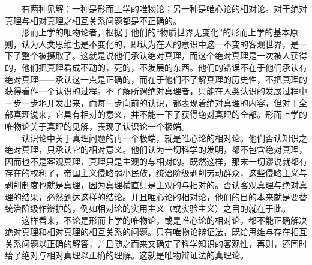 \documentclass[cn,11pt,chinese]{elegantbook}
\begin{document}
　　有两种见解：一种是形而上学的唯物论；另一种是唯心论的相对论。对于绝对真理与相对真理之相互关系问题都是不正确的。\\
　　形而上学的唯物论者，根据于他们的“物质世界无变化”的形而上学的基本原则，认为人类思维也是不变化的，即认为在人的意识中这一不变的客观世界，是一下子整个被摄取了。这就是说他们承认绝对真理，而这个绝对真理是一次被人获得的，他们把真理看成不动的，死的，不发展的东西。他们的错误不在于他们承认有绝对真理——承认这一点是正确的，而在于他们不了解真理的历史性，不把真理的获得看作一个认识的过程。不了解所谓绝对真理者，只能在人类认识的发展过程中一步一步地开发出来，而每一步向前的认识，都表现着绝对真理的内容，但对于全部真理说来，它具有相对的意义，并不能一下子获得绝对真理的全部。形而上学的唯物论关于真理的见解，表现了认识论一个极端。\\
　　认识论中关于真理问题的再一个极端，就是唯心论的相对论。他们否认知识之绝对真理，只承认它的相对意义。他们认为一切科学的发明，都不包含绝对真理，因而也不是客观真理，真理只是主观的与相对的。既然这样，那末一切谬说就都有存在的权利了，帝国主义侵略弱小民族，统治阶级剥削劳动群众，这些侵略主义与剥削制度也就是真理，因为真理横直只是主观的与相对的。否认客观真理与绝对真理的结果，必然到达这样的结论。并且唯心论的相对论，他们的目的本来就是要替统治阶级作辩护的，例如相对论的实用主义（或实验主义）之目的就在于此。\\
　　这样看来，不论是形而上学的唯物论，或是唯心论的相对论，都不能正确解决绝对真理和相对真理的相互关系的问题。只有唯物论辩证法，既给思维与存在相互关系问题以正确的解答，并且随之而来又确定了科学知识的客观性，再则，还同时给了绝对与相对真理以正确的理解。这就是唯物辩证法的真理论。\\
\end{document}

